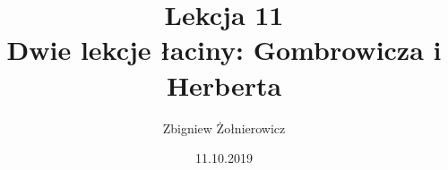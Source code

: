 \documentclass[a4paper]{article}
\begin{document}
\title{{\huge Lekcja 11} \\
{\large Dwie lekcje łaciny: Gombrowicza i Herberta}}
\author{Zbigniew Żołnierowicz}
\date{11.10.2019}
\maketitle
\end{document}
